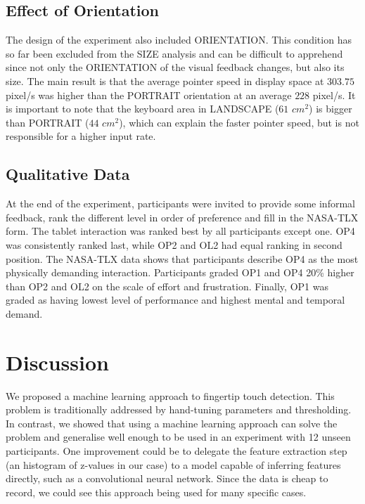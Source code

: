 \documentclass{chi-ext}
\newcommand{\cdt}[1]{{\small\uppercase{{#1}}}}
\begin{document}
\subsection{Effect of Orientation}
The design of the experiment also included \cdt{ORIENTATION}. This condition has so far been excluded from the SIZE analysis and can be difficult to apprehend since not only the \cdt{ORIENTATION} of the visual feedback changes, but also its size. The main result is that the average pointer speed in display space at $303.75$ pixel/s was higher than the PORTRAIT orientation at an average $228$ pixel/s. It is important to note that the keyboard area in LANDSCAPE ($61$ $cm^2$) is bigger than PORTRAIT ($44$ $cm^2$), which can explain the faster pointer speed, but is not responsible for a higher input rate.

\subsection{Qualitative Data}
At the end of the experiment, participants were invited to provide some informal feedback, rank the different level in order of preference and fill in the NASA-TLX form. The tablet interaction was ranked best by all participants except one. \cdt{OP4} was consistently ranked last, while \cdt{OP2} and \cdt{OL2} had equal ranking in second position. The NASA-TLX data shows that participants describe \cdt{OP4} as the most physically demanding interaction. Participants graded \cdt{OP1} and \cdt{OP4} 20\% higher than \cdt{OP2} and \cdt{OL2} on the scale of effort and frustration. Finally, \cdt{OP1} was graded as having lowest level of performance and highest mental and temporal demand.

\section{Discussion}

We proposed a machine learning approach to fingertip touch detection. This problem is traditionally addressed by hand-tuning parameters and thresholding. In contrast, we showed that using a machine learning approach can solve the problem and generalise well enough to be used in an experiment with 12 unseen participants. One improvement could be to delegate the feature extraction step (an histogram of z-values in our case) to a model capable of inferring features directly, such as a convolutional neural network. Since the data is cheap to record, we could see this approach being used for many specific cases.
\end{document}
